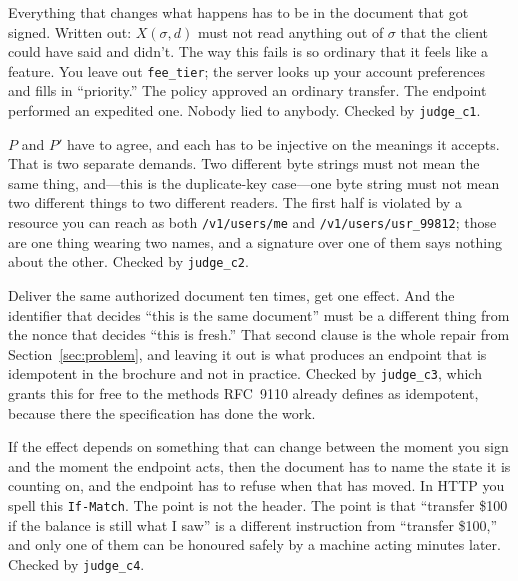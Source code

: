 \documentclass[11pt]{article}
\begin{document}
\begin{description}[leftmargin=1.6em, style=nextline]
\item[C1 --- Put every input in the message.]
Everything that changes what happens has to be in the document that got
signed. Written out: $X(\sigma, d)$ must not read anything out of $\sigma$
that the client could have said and didn't. The way this fails is so ordinary
that it feels like a feature. You leave out \texttt{fee\_tier}; the server
looks up your account preferences and fills in ``priority.'' The policy
approved an ordinary transfer. The endpoint performed an expedited one. Nobody
lied to anybody. Checked by \texttt{judge\_c1}.

\item[C2 --- One meaning, one spelling.]
$P$ and $P'$ have to agree, and each has to be injective on the meanings it
accepts. That is two separate demands. Two different byte strings must not
mean the same thing, and---this is the duplicate-key case---one byte string
must not mean two different things to two different readers. The first half is
violated by a resource you can reach as both \texttt{/v1/users/me} and
\texttt{/v1/users/usr\_99812}; those are one thing wearing two names, and a
signature over one of them says nothing about the other. Checked by
\texttt{judge\_c2}.

\item[C3 --- Make redelivery harmless, with two numbers not one.]
Deliver the same authorized document ten times, get one effect. And the
identifier that decides ``this is the same document'' must be a different
thing from the nonce that decides ``this is fresh.'' That second clause is the
whole repair from Section~\ref{sec:problem}, and leaving it out is what
produces an endpoint that is idempotent in the brochure and not in practice.
Checked by \texttt{judge\_c3}, which grants this for free to the methods
RFC~9110 already defines as idempotent, because there the specification has
done the work.

\item[C4 --- Say what state you are assuming.]
If the effect depends on something that can change between the moment you sign
and the moment the endpoint acts, then the document has to name the state it
is counting on, and the endpoint has to refuse when that has moved. In HTTP
you spell this \texttt{If-Match}. The point is not the header. The point is
that ``transfer \$100 if the balance is still what I saw'' is a different
instruction from ``transfer \$100,'' and only one of them can be honoured
safely by a machine acting minutes later. Checked by \texttt{judge\_c4}.
\end{description}
\end{document}
